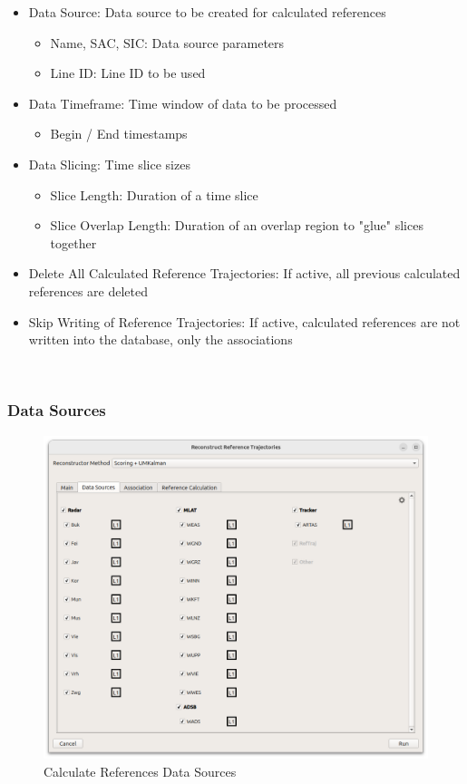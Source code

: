 \begin{itemize}
\item Data Source: Data source to be created for calculated references
    \begin{itemize}
    \item Name, SAC, SIC: Data source parameters
    \item Line ID: Line ID to be used
    \end{itemize}
\item Data Timeframe: Time window of data to be processed
    \begin{itemize}
    \item Begin / End timestamps
    \end{itemize}
\item Data Slicing: Time slice sizes
    \begin{itemize}
    \item Slice Length: Duration of a time slice
    \item Slice Overlap Length: Duration of an overlap region to "glue" slices together
    \end{itemize}
\item Delete All Calculated Reference Trajectories: If active, all previous calculated references are deleted
\item Skip Writing of Reference Trajectories: If active, calculated references are not written into the database, only the associations
\end{itemize}
\ \\

\subsubsection{Data Sources}

\begin{figure}[H]
    \center
      \includegraphics[width=16cm]{figures/dialog_data_sources.png}
    \caption{Calculate References Data Sources}
\end{figure}

